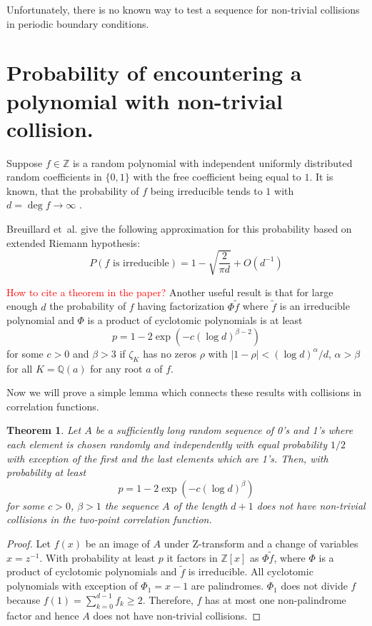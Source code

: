 \documentclass[12pt, a4paper]{article}
\newtheorem{theorem}{Theorem}
\begin{document}
Unfortunately, there is no known way to test a sequence for non-trivial
collisions in periodic boundary conditions.

\section{Probability of encountering a polynomial with non-trivial collision.}

Suppose $f \in \mathbb{Z}$ is a random polynomial with independent uniformly
distributed random coefficients in $\{0, 1\}$ with the free coefficient being
equal to $1$. It is known, that the probability of $f$ being irreducible tends
to $1$ with $d = \deg f \to \infty$ \cite{konyagin1999number}.

Breuillard et~al. \cite{breuillard2019irreducibility} give the following
approximation for this probability based on extended Riemann hypothesis:
\begin{equation}
  P(\text{$f$ is irreducible}) = 1 - \sqrt{\frac{2}{\pi d}} + O(d^{-1})
  \label{eq:prob-irr}
\end{equation}

\textcolor{red}{How to cite a theorem in the paper?}
Another useful result is that for large enough $d$ the probability
of $f$ having factorization $\Phi \tilde{f}$ where $\tilde{f}$ is an irreducible
polynomial and $\Phi$ is a product of cyclotomic polynomials is at least
\begin{equation}
  p = 1 - 2\exp(-c(\log d)^{\beta - 2})
  \label{eq:prob-cyc-1}
\end{equation}
for some $c > 0$ and $\beta > 3$ if $\zeta_K$ has no zeros $\rho$ with
$|1 - \rho| < (\log d)^\alpha/d$, $\alpha > \beta$ for all $K = \mathbb{Q}(a)$
for any root $a$ of $f$.

Now we will prove a simple lemma which connects these results with collisions in
correlation functions.
\begin{theorem}
  \label{the:sequence}
  Let $A$ be a sufficiently long random sequence of 0's and 1's where each
  element is chosen randomly and independently with equal probability $1/2$ with
  exception of the first and the last elements which are 1's. Then, with
  probability at least
  \begin{equation*}
    p = 1 - 2\exp(-c(\log d)^\beta)
  \end{equation*}
  for some $c > 0$, $\beta > 1$ the sequence $A$ of the length $d+1$ does not
  have non-trivial collisions in the two-point correlation function.
\end{theorem}
\begin{proof}
  Let $f(x)$ be an image of $A$ under Z-transform and a change of variables
  $x = z^{-1}$. With probability at least $p$ it factors in $\mathbb{Z}[x]$ as
  $\Phi \tilde{f}$, where $\Phi$ is a product of cyclotomic polynomials and
  $\tilde{f}$ is irreducible. All cyclotomic polynomials with exception of
  $\Phi_1 = x - 1$ are palindromes. $\Phi_1$ does not divide $f$ because
  $f(1) = \sum\limits_{k=0}^{d-1} f_k \ge 2$. Therefore, $f$ has at most one
  non-palindrome factor and hence $A$ does not have non-trivial collisions.
\end{proof}
\end{document}
